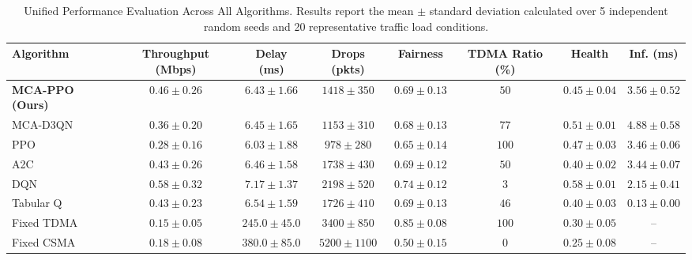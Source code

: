 \begin{table}[t]
    \centering
    \caption{Unified Performance Evaluation Across All Algorithms. Results report the mean $\pm$ standard deviation calculated over 5 independent random seeds and 20 representative traffic load conditions.}
    \label{tab:results}
    \begin{tabular}{@{}lccccccc@{}}
        \toprule
        \textbf{Algorithm} & \textbf{Throughput (Mbps)} & \textbf{Delay (ms)} & \textbf{Drops (pkts)} & \textbf{Fairness} & \textbf{TDMA Ratio (\%)} & \textbf{Health} & \textbf{Inf. (ms)} \\
        \midrule
        \textbf{MCA-PPO (Ours)} & $0.46 \pm 0.26$ & $6.43 \pm 1.66$ & $1418 \pm 350$ & $0.69 \pm 0.13$ & $50$ & $0.45 \pm 0.04$ & $3.56 \pm 0.52$ \\
        MCA-D3QN    & $0.36 \pm 0.20$ & $6.45 \pm 1.65$ & $1153 \pm 310$ & $0.68 \pm 0.13$ & $77$ & $0.51 \pm 0.01$ & $4.88 \pm 0.58$ \\
        PPO         & $0.28 \pm 0.16$ & $6.03 \pm 1.88$ & $978 \pm 280$ & $0.65 \pm 0.14$ & $100$ & $0.47 \pm 0.03$ & $3.46 \pm 0.06$ \\
        A2C         & $0.43 \pm 0.26$ & $6.46 \pm 1.58$ & $1738 \pm 430$ & $0.69 \pm 0.12$ & $50$ & $0.40 \pm 0.02$ & $3.44 \pm 0.07$ \\
        DQN         & $0.58 \pm 0.32$ & $7.17 \pm 1.37$ & $2198 \pm 520$ & $0.74 \pm 0.12$ & $3$ & $0.58 \pm 0.01$ & $2.15 \pm 0.41$ \\
        Tabular Q   & $0.43 \pm 0.23$ & $6.54 \pm 1.59$ & $1726 \pm 410$ & $0.69 \pm 0.13$ & $46$ & $0.40 \pm 0.03$ & $0.13 \pm 0.00$ \\
        \midrule
        Fixed TDMA  & $0.15 \pm 0.05$ & $245.0 \pm 45.0$ & $3400 \pm 850$ & $0.85 \pm 0.08$ & $100$ & $0.30 \pm 0.05$ & -- \\
        Fixed CSMA  & $0.18 \pm 0.08$ & $380.0 \pm 85.0$ & $5200 \pm 1100$ & $0.50 \pm 0.15$ & $0$ & $0.25 \pm 0.08$ & -- \\
        \bottomrule
    \end{tabular}
\end{table}

